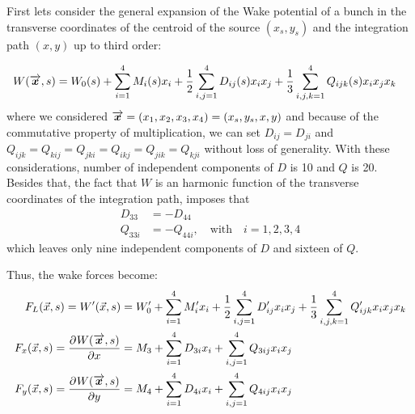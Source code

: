 First lets consider the general expansion of the Wake potential of a bunch in the transverse coordinates of the centroid of the source $(x_s,y_s)$ and the integration path $(x,y)$ up to third order:

\begin{align}
W(\overrightarrow{\boldsymbol{x}},s) &= W_0(s) + \sum_{i=1}^4 M_i(s) x_i + \frac12\sum_{i,j=1}^4 D_{ij}(s) x_i x_j + \frac13\sum_{i,j,k=1}^4 Q_{ijk}(s) x_i x_j x_k
\end{align}
where we considered $\overrightarrow{\boldsymbol{x}} = (x_1,x_2,x_3,x_4) = (x_s,y_s,x,y)$ and because of the commutative property of multiplication, we can set $D_{ij} = D_{ji}$ and $Q_{ijk}=Q_{kij}=Q_{jki}=Q_{ikj}=Q_{jik}=Q_{kji}$ without loss of generality. With these considerations, number of independent components of $D$ is 10 and $Q$ is 20. Besides that, the fact that $W$ is an harmonic function of the transverse coordinates of the integration path, imposes that
\begin{align}
D_{33} &= - D_{44} \\
Q_{33i} &= - Q_{44i}, \quad \text{with} \quad i=1,2,3,4
\end{align}
which leaves only nine independent components of $D$ and sixteen of $Q$.

Thus, the wake forces become:
\begin{align}
F_L(\vec{x},s) = W'(\vec{x},s) &= W_0' + \sum_{i=1}^4 M_i' x_i + \frac12\sum_{i,j=1}^4 D_{ij}' x_i x_j + \frac13\sum_{i,j,k=1}^4 Q_{ijk}' x_i x_j x_k \\
F_x(\vec{x},s) = \frac{\partial^{{}}W(\overrightarrow{\boldsymbol{x}},s)}{\partial x^{{}}} &= M_3 + \sum_{i=1}^4 D_{3i} x_i + \sum_{i,j=1}^4 Q_{3ij} x_i x_j \\
F_y(\vec{x},s) = \frac{\partial^{{}}W(\overrightarrow{\boldsymbol{x}},s)}{\partial y^{{}}} &= M_4 + \sum_{i=1}^4 D_{4i} x_i + \sum_{i,j=1}^4 Q_{4ij} x_i x_j
\end{align}

